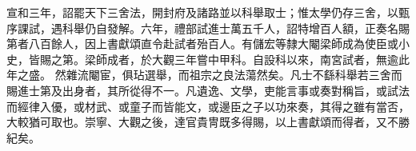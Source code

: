 \begin{pinyinscope}
 宣和三年，詔罷天下三舍法，開封府及諸路並以科舉取士；惟太學仍存三舍，以甄序課試，遇科舉仍自發解。六年，禮部試進士萬五千人，詔特增百人額，正奏名賜第者八百餘人，因上書獻頌直令赴試者殆百人。有儲宏等隸大閹梁師成為使臣或小史，皆賜之第。梁師成者，於大觀三年嘗中甲科。自設科以來，南宮試者，無逾此年之盛。
 然雜流閹宦，俱玷選舉，而祖宗之良法蕩然矣。凡士不繇科舉若三舍而賜進士第及出身者，其所從得不一。凡遺逸、文學，吏能言事或奏對稱旨，或試法而經律入優，或材武、或童子而皆能文，或邊臣之子以功來奏，其得之雖有當否，大較猶可取也。崇寧、大觀之後，達官貴冑既多得賜，以上書獻頌而得者，又不勝紀矣。



\end{pinyinscope}